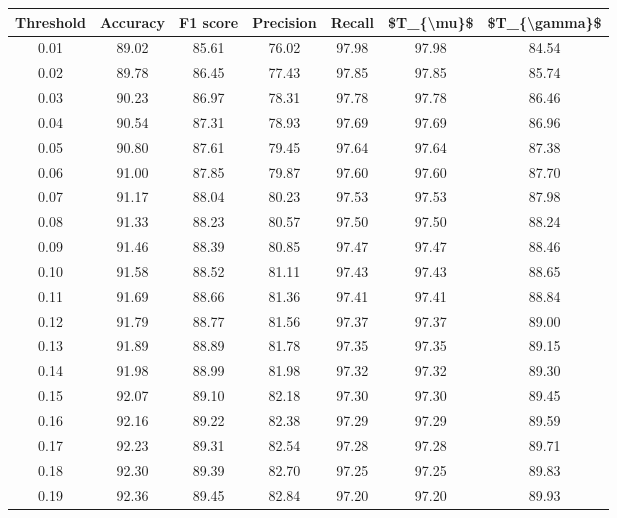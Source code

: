 \begin{tabular}{|c|c|c|c|c|c|c|}
\hline
 Threshold &  Accuracy &  F1 score &  Precision &  Recall &  \$T\_\{\textbackslash mu\}\$ &  \$T\_\{\textbackslash gamma\}\$ \\
\hline
      0.01 &     89.02 &     85.61 &      76.02 &   97.98 &      97.98 &         84.54 \\
      0.02 &     89.78 &     86.45 &      77.43 &   97.85 &      97.85 &         85.74 \\
      0.03 &     90.23 &     86.97 &      78.31 &   97.78 &      97.78 &         86.46 \\
      0.04 &     90.54 &     87.31 &      78.93 &   97.69 &      97.69 &         86.96 \\
      0.05 &     90.80 &     87.61 &      79.45 &   97.64 &      97.64 &         87.38 \\
      0.06 &     91.00 &     87.85 &      79.87 &   97.60 &      97.60 &         87.70 \\
      0.07 &     91.17 &     88.04 &      80.23 &   97.53 &      97.53 &         87.98 \\
      0.08 &     91.33 &     88.23 &      80.57 &   97.50 &      97.50 &         88.24 \\
      0.09 &     91.46 &     88.39 &      80.85 &   97.47 &      97.47 &         88.46 \\
      0.10 &     91.58 &     88.52 &      81.11 &   97.43 &      97.43 &         88.65 \\
      0.11 &     91.69 &     88.66 &      81.36 &   97.41 &      97.41 &         88.84 \\
      0.12 &     91.79 &     88.77 &      81.56 &   97.37 &      97.37 &         89.00 \\
      0.13 &     91.89 &     88.89 &      81.78 &   97.35 &      97.35 &         89.15 \\
      0.14 &     91.98 &     88.99 &      81.98 &   97.32 &      97.32 &         89.30 \\
      0.15 &     92.07 &     89.10 &      82.18 &   97.30 &      97.30 &         89.45 \\
      0.16 &     92.16 &     89.22 &      82.38 &   97.29 &      97.29 &         89.59 \\
      0.17 &     92.23 &     89.31 &      82.54 &   97.28 &      97.28 &         89.71 \\
      0.18 &     92.30 &     89.39 &      82.70 &   97.25 &      97.25 &         89.83 \\
      0.19 &     92.36 &     89.45 &      82.84 &   97.20 &      97.20 &         89.93 \\

\end{tabular}
